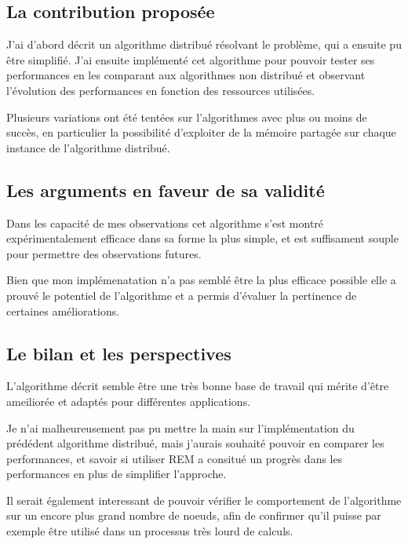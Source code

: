 \documentclass{article}
\newenvironment{point}[1]%
{\subsection*{#1}}%
{}
\begin{document}
\begin{point}{La contribution proposée}

  J'ai d'abord décrit un algorithme distribué résolvant le problème, qui a ensuite pu être simplifié.
  J'ai ensuite implémenté cet algorithme pour pouvoir tester ses performances en les comparant aux algorithmes non distribué et observant l'évolution des performances en fonction des ressources utilisées.

  Plusieurs variations ont été tentées sur l'algorithmes avec plus ou moins de succès, en particulier la possibilité d'exploiter de la mémoire partagée sur chaque instance de l'algorithme distribué.

\end{point}

\begin{point}{Les arguments en faveur de sa validité}

  Dans les capacité de mes observations cet algorithme s'est montré expérimentalement efficace dans sa forme la plus simple, et est suffisament souple pour permettre des observations futures.

  Bien que mon implémenatation n'a pas semblé être la plus efficace possible elle a prouvé le potentiel de l'algorithme et a permis d'évaluer la pertinence de certaines améliorations.

\end{point}


\begin{point}{Le bilan et les perspectives}
  L'algorithme décrit semble être une très bonne base de travail qui mérite d'être ameiliorée et adaptés pour différentes applications.

  Je n'ai malheureusement pas pu mettre la main sur l'implémentation du prédédent algorithme distribué, mais j'aurais souhaité pouvoir en comparer les performances, et savoir si utiliser REM a consitué un progrès dans les performances en plus de simplifier l'approche.

  Il serait également interessant de pouvoir vérifier le comportement de l'algorithme sur un encore plus grand nombre de noeuds, afin de confirmer qu'il puisse par exemple être utilisé dans un processus très lourd de calculs.

\end{point}
\end{document}
